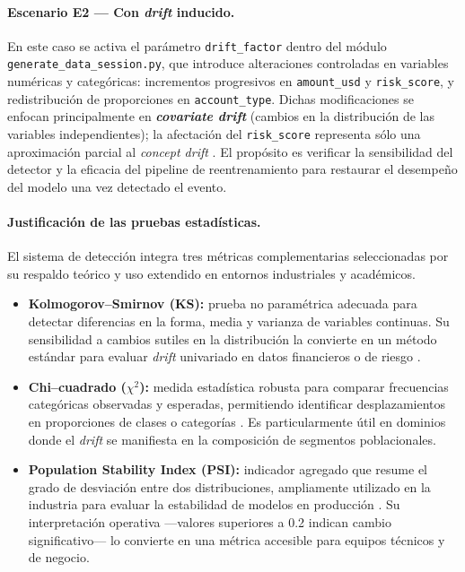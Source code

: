 \paragraph{Escenario E2 — Con \textit{drift} inducido.}
En este caso se activa el parámetro \texttt{drift\_factor} dentro del módulo \texttt{generate\_data\_session.py}, que introduce alteraciones controladas en variables numéricas y categóricas: incrementos progresivos en \texttt{amount\_usd} y \texttt{risk\_score}, y redistribución de proporciones en \texttt{account\_type}. Dichas modificaciones se enfocan principalmente en \textbf{\textit{covariate drift}} (cambios en la distribución de las variables independientes); la afectación del \texttt{risk\_score} representa sólo una aproximación parcial al \textit{concept drift} \citep{Lu2019,Sethi2017}. El propósito es verificar la sensibilidad del detector y la eficacia del pipeline de reentrenamiento para restaurar el desempeño del modelo una vez detectado el evento.

\paragraph{Justificación de las pruebas estadísticas.}
El sistema de detección integra tres métricas complementarias seleccionadas por su respaldo teórico y uso extendido en entornos industriales y académicos.  

\begin{itemize}
    \item \textbf{Kolmogorov–Smirnov (KS):} prueba no paramétrica adecuada para detectar diferencias en la forma, media y varianza de variables continuas. Su sensibilidad a cambios sutiles en la distribución la convierte en un método estándar para evaluar \textit{drift} univariado en datos financieros o de riesgo \citep{Lu2019,Chawla2021}.
    \item \textbf{Chi–cuadrado ($\chi^2$):} medida estadística robusta para comparar frecuencias categóricas observadas y esperadas, permitiendo identificar desplazamientos en proporciones de clases o categorías \citep{Sethi2017}. Es particularmente útil en dominios donde el \textit{drift} se manifiesta en la composición de segmentos poblacionales.
    \item \textbf{Population Stability Index (PSI):} indicador agregado que resume el grado de desviación entre dos distribuciones, ampliamente utilizado en la industria para evaluar la estabilidad de modelos en producción \citep{Breck2019}. Su interpretación operativa —valores superiores a 0.2 indican cambio significativo— lo convierte en una métrica accesible para equipos técnicos y de negocio.
\end{itemize}

